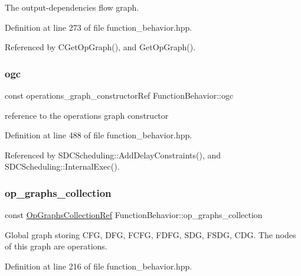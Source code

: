 The output-\/dependencies flow graph. 



Definition at line 273 of file function\+\_\+behavior.\+hpp.



Referenced by C\+Get\+Op\+Graph(), and Get\+Op\+Graph().

\mbox{\label{classFunctionBehavior_a26bfae64c02d06004c933aac54a80ac6}} 
\subsubsection{\texorpdfstring{ogc}{ogc}}
{\footnotesize\ttfamily const operations\+\_\+graph\+\_\+constructor\+Ref Function\+Behavior\+::ogc}



reference to the operations graph constructor 



Definition at line 488 of file function\+\_\+behavior.\+hpp.



Referenced by S\+D\+C\+Scheduling\+::\+Add\+Delay\+Constraints(), and S\+D\+C\+Scheduling\+::\+Internal\+Exec().

\mbox{\label{classFunctionBehavior_a3329d013ce9b021cfca706f34b9986d7}} 
\subsubsection{\texorpdfstring{op\+\_\+graphs\+\_\+collection}{op\_graphs\_collection}}
{\footnotesize\ttfamily const \hyperlink{op__graph_8hpp_a6a9918dc96f448814ad35759f9460ed7}{Op\+Graphs\+Collection\+Ref} Function\+Behavior\+::op\+\_\+graphs\+\_\+collection\hspace{0.3cm}{\ttfamily [private]}}



Global graph storing C\+FG, D\+FG, F\+C\+FG, F\+D\+FG, S\+DG, F\+S\+DG, C\+DG. The nodes of this graph are operations. 



Definition at line 216 of file function\+\_\+behavior.\+hpp.



